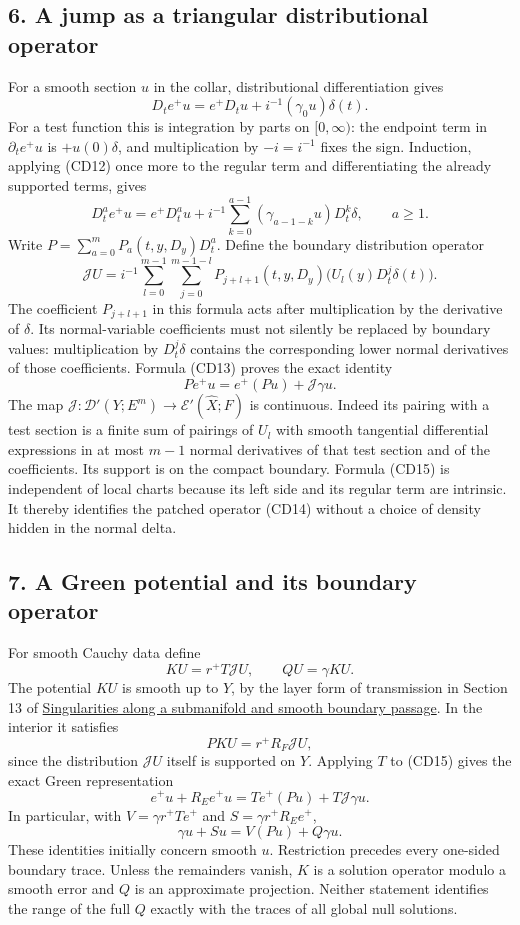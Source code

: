 \documentclass[
  11pt,
]{article}
\begin{document}
\subsection{6. A jump as a triangular distributional
operator}\label{a-jump-as-a-triangular-distributional-operator}

For a smooth section \(u\) in the collar, distributional differentiation
gives \[
D_t e^+u=e^+D_tu+i^{-1}(\gamma_0u)\delta(t).
\tag{CD12}
\] For a test function this is integration by parts on \([0,\infty)\):
the endpoint term in \(\partial_te^+u\) is \(+u(0)\delta\), and
multiplication by \(-i=i^{-1}\) fixes the sign. Induction, applying
(CD12) once more to the regular term and differentiating the already
supported terms, gives \[
D_t^ae^+u=e^+D_t^au+i^{-1}\sum_{k=0}^{a-1}(\gamma_{a-1-k}u)D_t^k\delta,
\qquad a\geq1.
\tag{CD13}
\] Write \(P=\sum_{a=0}^mP_a(t,y,D_y)D_t^a\). Define the boundary
distribution operator \[
\mathcal JU=i^{-1}\sum_{l=0}^{m-1}\sum_{j=0}^{m-1-l}
P_{j+l+1}(t,y,D_y)\big(U_l(y)D_t^j\delta(t)\big).
\tag{CD14}
\] The coefficient \(P_{j+l+1}\) in this formula acts after
multiplication by the derivative of \(\delta\). Its normal-variable
coefficients must not silently be replaced by boundary values:
multiplication by \(D_t^j\delta\) contains the corresponding lower
normal derivatives of those coefficients. Formula (CD13) proves the
exact identity \[
Pe^+u=e^+(Pu)+\mathcal J\gamma u.
\tag{CD15}
\] The map \(\mathcal J:\mathcal D'(Y;E^m)\to\mathcal E'(\widehat X;F)\)
is continuous. Indeed its pairing with a test section is a finite sum of
pairings of \(U_l\) with smooth tangential differential expressions in
at most \(m-1\) normal derivatives of that test section and of the
coefficients. Its support is on the compact boundary. Formula (CD15) is
independent of local charts because its left side and its regular term
are intrinsic. It thereby identifies the patched operator (CD14) without
a choice of density hidden in the normal delta.

\subsection{7. A Green potential and its boundary
operator}\label{a-green-potential-and-its-boundary-operator}

For smooth Cauchy data define \[
KU=r^+T\mathcal JU,\qquad QU=\gamma KU.
\tag{CD16}
\] The potential \(KU\) is smooth up to \(Y\), by the layer form of
transmission in Section 13 of
\href{conormal-transmission.pdf}{Singularities along a submanifold and
smooth boundary passage}. In the interior it satisfies \[
PKU=r^+R_F\mathcal JU,
\tag{CD17}
\] since the distribution \(\mathcal JU\) itself is supported on \(Y\).
Applying \(T\) to (CD15) gives the exact Green representation \[
e^+u+R_Ee^+u=Te^+(Pu)+T\mathcal J\gamma u.
\tag{CD18}
\] In particular, with \(V=\gamma r^+Te^+\) and \(S=\gamma r^+R_Ee^+\),
\[
\gamma u+Su=V(Pu)+Q\gamma u.
\tag{CD19}
\] These identities initially concern smooth \(u\). Restriction precedes
every one-sided boundary trace. Unless the remainders vanish, \(K\) is a
solution operator modulo a smooth error and \(Q\) is an approximate
projection. Neither statement identifies the range of the full \(Q\)
exactly with the traces of all global null solutions.
\end{document}
